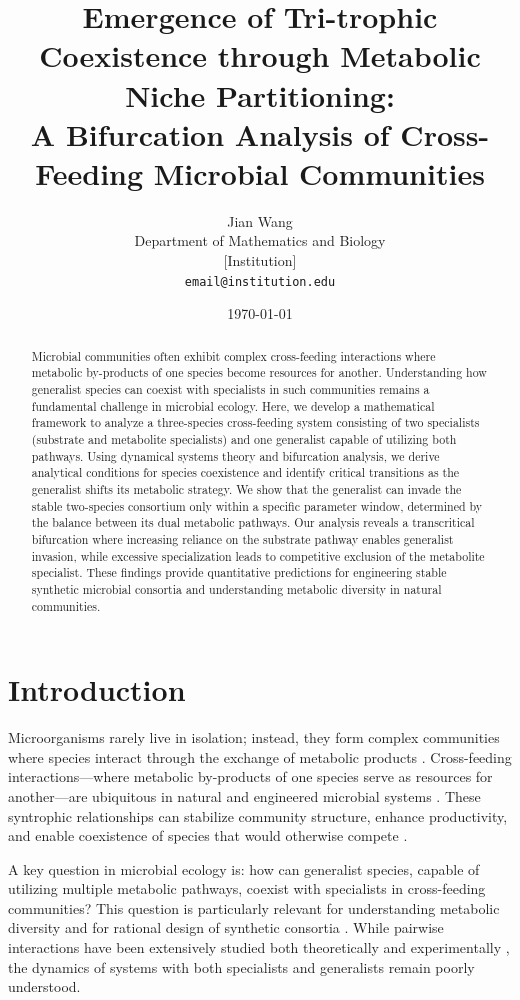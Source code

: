 \documentclass[11pt]{article}
\title{\textbf{Emergence of Tri-trophic Coexistence through Metabolic Niche Partitioning:\\
A Bifurcation Analysis of Cross-Feeding Microbial Communities}}
\author{Jian Wang\\
\small Department of Mathematics and Biology\\
\small [Institution]\\
\small \texttt{email@institution.edu}}
\date{\today}
\begin{document}
\maketitle

\begin{abstract}
Microbial communities often exhibit complex cross-feeding interactions where metabolic by-products of one species become resources for another. Understanding how generalist species can coexist with specialists in such communities remains a fundamental challenge in microbial ecology. Here, we develop a mathematical framework to analyze a three-species cross-feeding system consisting of two specialists (substrate and metabolite specialists) and one generalist capable of utilizing both pathways. Using dynamical systems theory and bifurcation analysis, we derive analytical conditions for species coexistence and identify critical transitions as the generalist shifts its metabolic strategy. We show that the generalist can invade the stable two-species consortium only within a specific parameter window, determined by the balance between its dual metabolic pathways. Our analysis reveals a transcritical bifurcation where increasing reliance on the substrate pathway enables generalist invasion, while excessive specialization leads to competitive exclusion of the metabolite specialist. These findings provide quantitative predictions for engineering stable synthetic microbial consortia and understanding metabolic diversity in natural communities.
\end{abstract}

\section{Introduction}

Microorganisms rarely live in isolation; instead, they form complex communities where species interact through the exchange of metabolic products \cite{goldford2018emergent,pacheco2019costless}. Cross-feeding interactions—where metabolic by-products of one species serve as resources for another—are ubiquitous in natural and engineered microbial systems \cite{ponomarova2017metabolic}. These syntrophic relationships can stabilize community structure, enhance productivity, and enable coexistence of species that would otherwise compete \cite{gore2009snowdrift,harcombe2014metabolic}.

A key question in microbial ecology is: how can generalist species, capable of utilizing multiple metabolic pathways, coexist with specialists in cross-feeding communities? This question is particularly relevant for understanding metabolic diversity and for rational design of synthetic consortia \cite{klitgord2010environments,zelezniak2015metabolic}. While pairwise interactions have been extensively studied both theoretically and experimentally \cite{momeni2011spatial,muller2014venn}, the dynamics of systems with both specialists and generalists remain poorly understood.
\end{document}
